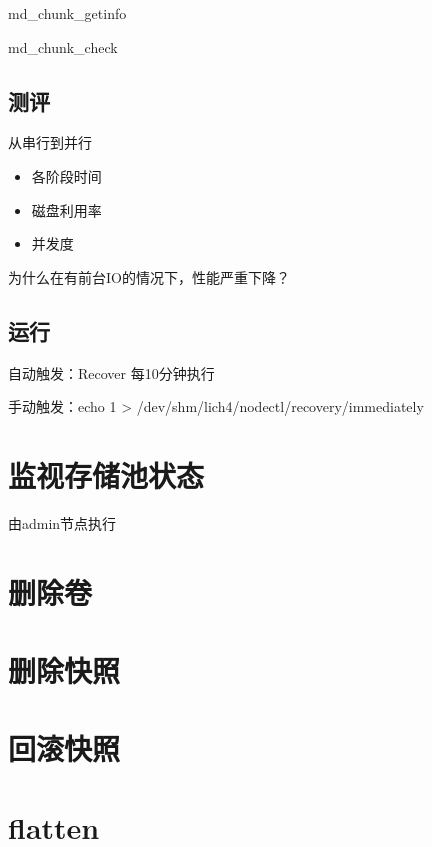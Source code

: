 md\_chunk\_getinfo

md\_chunk\_check

\subsection{测评}

从串行到并行

\begin{itemize}
\item 各阶段时间
\item 磁盘利用率
\item 并发度
\end{itemize}

为什么在有前台IO的情况下，性能严重下降？

\subsection{运行}

\begin{tcolorbox}
    自动触发：Recover 每10分钟执行

    手动触发：echo 1 > /dev/shm/lich4/nodectl/recovery/immediately
\end{tcolorbox}

\section{监视存储池状态}

由admin节点执行

\section{删除卷}

\section{删除快照}

\section{回滚快照}

\section{flatten}




